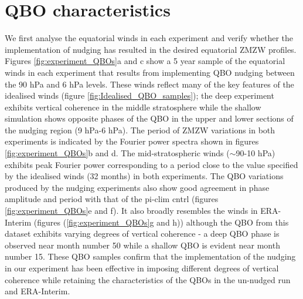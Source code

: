 \section{QBO characteristics}
We first analyse the equatorial winds in each experiment and verify whether the implementation of nudging has resulted in the desired equatorial ZMZW profiles. Figures \ref{fig:experiment_QBOs}a and c show a 5 year sample of the equatorial winds in each experiment that results from implementing QBO nudging between the 90 hPa and 6 hPa levels. These winds reflect many of the key features of the idealised winds (figure \ref{fig:Idealised_QBO_samples}); the deep experiment exhibits vertical coherence in the middle stratosphere while the shallow simulation shows opposite phases of the QBO in the upper and lower sections of the nudging region (9 hPa-6 hPa). The period of ZMZW variations in both experiments is indicated by the Fourier power spectra shown in figures \ref{fig:experiment_QBOs}b and d. The mid-stratospheric winds ($\sim$90-10 hPa) exhibits peak Fourier power corresponding to a period close to the value specified by the idealised winds (32 months) in both experiments. The QBO variations produced by the nudging experiments also show good agreement in phase amplitude and period with that of the pi-clim cntrl (figures \ref{fig:experiment_QBOs}e and f). It also broadly resembles the winds in ERA-Interim (figures (\ref{fig:experiment_QBOs}g and h)) although the QBO from this dataset exhibits varying degrees of vertical coherence - a deep QBO phase is observed near month number 50 while a shallow QBO is evident near month number 15. These QBO samples confirm that the implementation of the nudging in our experiment has been effective in imposing different degrees of vertical coherence while retaining the characteristics of the QBOs in the un-nudged run and ERA-Interim.

